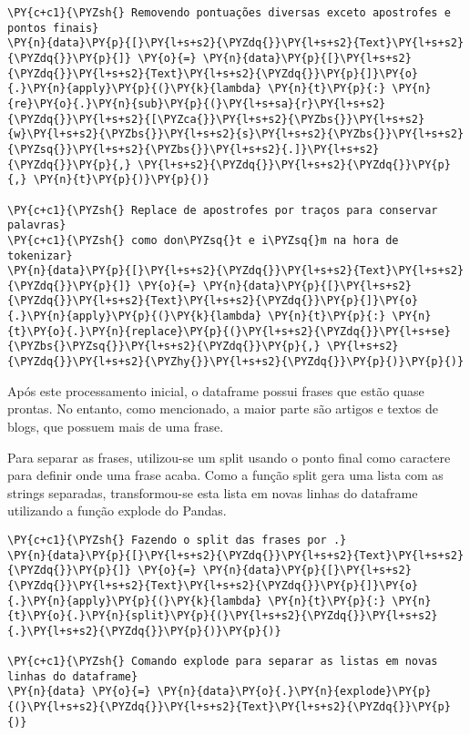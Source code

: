 \documentclass[a4paper,11pt,final]{article}
\begin{document}
\begin{Verbatim}[commandchars=\\\{\},frame=single,fontsize=\small, xleftmargin=0.5em]
\PY{c+c1}{\PYZsh{} Removendo pontuações diversas exceto apostrofes e pontos finais}
\PY{n}{data}\PY{p}{[}\PY{l+s+s2}{\PYZdq{}}\PY{l+s+s2}{Text}\PY{l+s+s2}{\PYZdq{}}\PY{p}{]} \PY{o}{=} \PY{n}{data}\PY{p}{[}\PY{l+s+s2}{\PYZdq{}}\PY{l+s+s2}{Text}\PY{l+s+s2}{\PYZdq{}}\PY{p}{]}\PY{o}{.}\PY{n}{apply}\PY{p}{(}\PY{k}{lambda} \PY{n}{t}\PY{p}{:} \PY{n}{re}\PY{o}{.}\PY{n}{sub}\PY{p}{(}\PY{l+s+sa}{r}\PY{l+s+s2}{\PYZdq{}}\PY{l+s+s2}{[\PYZca{}}\PY{l+s+s2}{\PYZbs{}}\PY{l+s+s2}{w}\PY{l+s+s2}{\PYZbs{}}\PY{l+s+s2}{s}\PY{l+s+s2}{\PYZbs{}}\PY{l+s+s2}{\PYZsq{}}\PY{l+s+s2}{\PYZbs{}}\PY{l+s+s2}{.]}\PY{l+s+s2}{\PYZdq{}}\PY{p}{,} \PY{l+s+s2}{\PYZdq{}}\PY{l+s+s2}{\PYZdq{}}\PY{p}{,} \PY{n}{t}\PY{p}{)}\PY{p}{)}

\PY{c+c1}{\PYZsh{} Replace de apostrofes por traços para conservar palavras}
\PY{c+c1}{\PYZsh{} como don\PYZsq{}t e i\PYZsq{}m na hora de tokenizar}
\PY{n}{data}\PY{p}{[}\PY{l+s+s2}{\PYZdq{}}\PY{l+s+s2}{Text}\PY{l+s+s2}{\PYZdq{}}\PY{p}{]} \PY{o}{=} \PY{n}{data}\PY{p}{[}\PY{l+s+s2}{\PYZdq{}}\PY{l+s+s2}{Text}\PY{l+s+s2}{\PYZdq{}}\PY{p}{]}\PY{o}{.}\PY{n}{apply}\PY{p}{(}\PY{k}{lambda} \PY{n}{t}\PY{p}{:} \PY{n}{t}\PY{o}{.}\PY{n}{replace}\PY{p}{(}\PY{l+s+s2}{\PYZdq{}}\PY{l+s+se}{\PYZbs{}\PYZsq{}}\PY{l+s+s2}{\PYZdq{}}\PY{p}{,} \PY{l+s+s2}{\PYZdq{}}\PY{l+s+s2}{\PYZhy{}}\PY{l+s+s2}{\PYZdq{}}\PY{p}{)}\PY{p}{)}
\end{Verbatim}


Após este processamento inicial, o dataframe possui frases que estão quase prontas. 
No entanto, como mencionado, a maior parte são artigos e textos de blogs, que possuem mais de uma frase.

Para separar as frases, utilizou-se um split usando o ponto final como caractere para definir onde uma frase acaba.
Como a função split gera uma lista com as strings separadas, transformou-se esta lista em novas linhas do dataframe utilizando a função explode do Pandas.



\begin{Verbatim}[commandchars=\\\{\},frame=single,fontsize=\small, xleftmargin=0.5em]
\PY{c+c1}{\PYZsh{} Fazendo o split das frases por .}
\PY{n}{data}\PY{p}{[}\PY{l+s+s2}{\PYZdq{}}\PY{l+s+s2}{Text}\PY{l+s+s2}{\PYZdq{}}\PY{p}{]} \PY{o}{=} \PY{n}{data}\PY{p}{[}\PY{l+s+s2}{\PYZdq{}}\PY{l+s+s2}{Text}\PY{l+s+s2}{\PYZdq{}}\PY{p}{]}\PY{o}{.}\PY{n}{apply}\PY{p}{(}\PY{k}{lambda} \PY{n}{t}\PY{p}{:} \PY{n}{t}\PY{o}{.}\PY{n}{split}\PY{p}{(}\PY{l+s+s2}{\PYZdq{}}\PY{l+s+s2}{.}\PY{l+s+s2}{\PYZdq{}}\PY{p}{)}\PY{p}{)}

\PY{c+c1}{\PYZsh{} Comando explode para separar as listas em novas linhas do dataframe}
\PY{n}{data} \PY{o}{=} \PY{n}{data}\PY{o}{.}\PY{n}{explode}\PY{p}{(}\PY{l+s+s2}{\PYZdq{}}\PY{l+s+s2}{Text}\PY{l+s+s2}{\PYZdq{}}\PY{p}{)}
\end{Verbatim}
\end{document}
